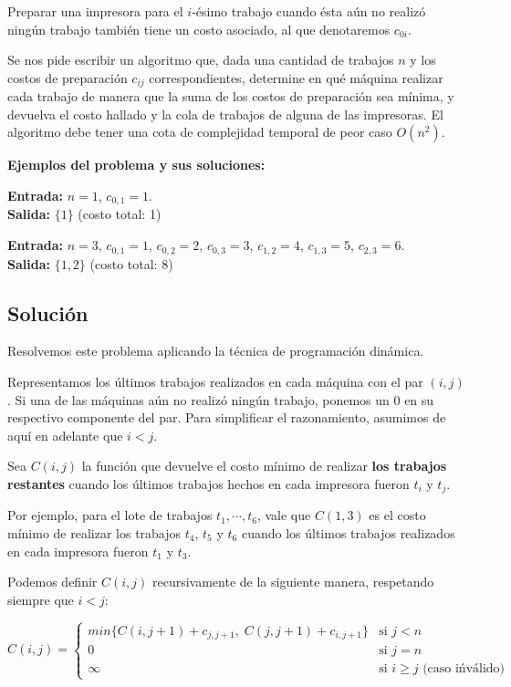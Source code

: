 \documentclass[a4paper, 10pt, twoside]{article}
\begin{document}
Preparar una impresora para el $i$-ésimo trabajo cuando ésta aún no realizó ningún trabajo también tiene un costo asociado, al que denotaremos $c_{0i}$.

Se nos pide escribir un algoritmo que, dada una cantidad de trabajos $n$ y los costos de preparación $c_{ij}$ correspondientes, determine en qué máquina realizar cada trabajo de manera que la suma de los costos de preparación sea mínima, y devuelva el costo hallado y la cola de trabajos de alguna de las impresoras. El algoritmo debe tener una cota de complejidad temporal de peor caso $O(n^2)$.

\textbf{Ejemplos del problema y sus soluciones:}

\textbf{Entrada:} $n = 1$, $c_{0, 1} = 1$. \\
\textbf{Salida:} $\{ 1 \}$ (costo total: 1)

\textbf{Entrada:} $n = 3$, $c_{0, 1} = 1$, $c_{0, 2} = 2$, $c_{0, 3} = 3$, 
                           $c_{1, 2} = 4$, $c_{1, 3} = 5$, $c_{2, 3} = 6$. \\
\textbf{Salida:} $\{ 1, 2 \}$ (costo total: 8)


\subsection{Solución}

Resolvemos este problema aplicando la técnica de programación dinámica.

Representamos los últimos trabajos realizados en cada máquina con el par $(i, j)$. Si una de las máquinas aún no realizó ningún trabajo, ponemos un $0$ en su respectivo componente del par. Para simplificar el razonamiento, asumimos de aquí en adelante que $i < j$.

Sea $C(i, j)$ la función que devuelve el costo mínimo de realizar \textbf{los trabajos restantes} cuando los últimos trabajos hechos en cada impresora fueron $t_i$ y $t_j$.

Por ejemplo, para el lote de trabajos $t_1, \cdots, t_6$, vale que $C(1, 3)$ es el costo mínimo de realizar los trabajos $t_4$, $t_5$ y $t_6$ cuando los últimos trabajos realizados en cada impresora fueron $t_1$ y $t_3$.

Podemos definir $C(i, j)$ recursivamente de la siguiente manera, respetando siempre que $i < j$:

$$
C(i, j) =
\left\{
  \begin{array}{ll}
    min\{ C(i, j + 1) + c_{j, j + 1}, \; C(j, j + 1) + c_{i, j + 1} \} & \mbox{si } j < n \\
    0                                                                  & \mbox{si } j = n \\
    \infty                                                             & \mbox{si } i \geq j \mbox{ (caso ińválido)}
  \end{array}
\right.
$$
\end{document}
